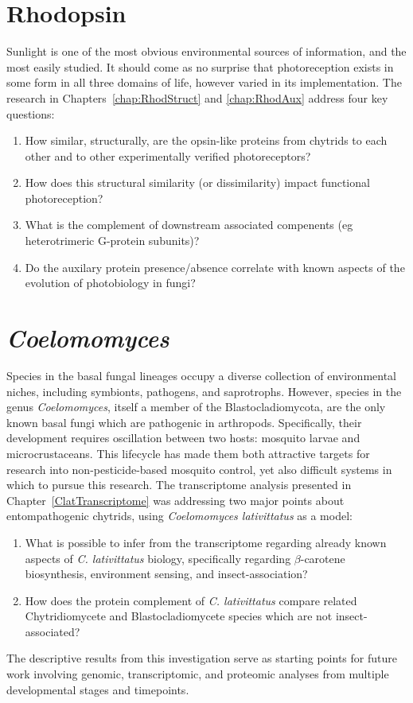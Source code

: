 \section{Rhodopsin}
Sunlight is one of the most obvious environmental sources of information, and the most easily studied. It should come as no surprise that photoreception exists in some form in all three domains of life, however varied in its implementation. The research in Chapters~\ref{chap:RhodStruct} and \ref{chap:RhodAux} address four key questions:\\
\begin{enumerate}
  \item How similar, structurally, are the opsin-like proteins from chytrids to each other and to other experimentally verified photoreceptors?
  \item How does this structural similarity (or dissimilarity) impact functional photoreception?
  \item What is the complement of downstream associated compenents (eg heterotrimeric G-protein subunits)?
  \item Do the auxilary protein presence/absence correlate with known aspects of the evolution of photobiology in fungi?
\end{enumerate}
\section{\textit{Coelomomyces}}
Species in the basal fungal lineages occupy a diverse collection of environmental niches, including symbionts, pathogens, and saprotrophs. However, species in the genus \textit{Coelomomyces}, itself a member of the Blastocladiomycota, are the only known basal fungi which are pathogenic in arthropods. Specifically, their development requires oscillation between two hosts: mosquito larvae and microcrustaceans. This lifecycle has made them both attractive targets for research into non-pesticide-based mosquito control, yet also difficult systems in which to pursue this research. The transcriptome analysis presented in Chapter~\ref{ClatTranscriptome} was addressing two major points about entompathogenic chytrids, using \textit{Coelomomyces lativittatus} as a model:\\
\begin{enumerate}
  \item What is possible to infer from the transcriptome regarding already known aspects of \textit{C. lativittatus} biology, specifically regarding $\beta$-carotene biosynthesis, environment sensing, and insect-association?
  \item How does the protein complement of \textit{C. lativittatus} compare related Chytridiomycete and Blastocladiomycete species which are not insect-associated?
\end{enumerate}
\indent The descriptive results from this investigation serve as starting points for future work involving genomic, transcriptomic, and proteomic analyses from multiple developmental stages and timepoints.\\

